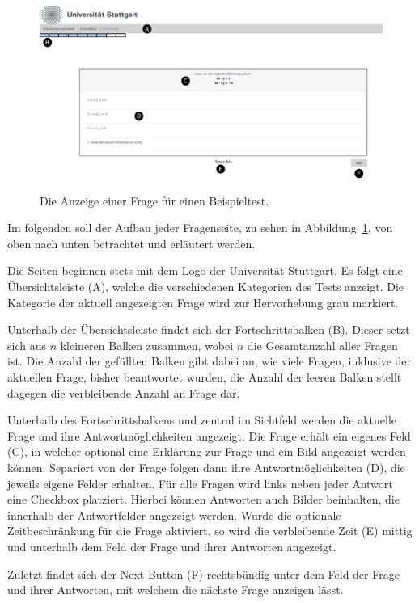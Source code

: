  \begin{figure} 
  \centering
     \includegraphics[width=\textwidth]{Jena_Images/beispielfrage.png}
  \caption{Die Anzeige einer Frage für einen Beispieltest.}
  \label{fig:beispielfrage}
\end{figure}
Im folgenden soll der Aufbau jeder Fragenseite, zu sehen in Abbildung~\ref{fig:beispielfrage}, von oben nach unten betrachtet und erläutert werden. 
  
Die Seiten beginnen stets mit dem Logo der Universität Stuttgart. 
Es folgt eine Übersichtsleiste (A), welche die verschiedenen Kategorien des Tests anzeigt. 
Die Kategorie der aktuell angezeigten Frage wird zur Hervorhebung grau markiert. 

Unterhalb der Übersichtsleiste findet sich der Fortschrittsbalken (B). 
Dieser setzt sich aus $n$ kleineren Balken zusammen, wobei $n$ die Gesamtanzahl aller Fragen ist.
Die Anzahl der gefüllten Balken gibt dabei an, wie viele Fragen, inklusive der aktuellen Frage, bisher beantwortet wurden, die Anzahl der leeren Balken stellt dagegen die verbleibende Anzahl an Frage dar. 

Unterhalb des Fortschrittsbalkens und zentral im Sichtfeld werden die aktuelle Frage und ihre Antwortmöglichkeiten angezeigt. 
Die Frage erhält ein eigenes Feld (C), in welcher optional eine Erklärung zur Frage und ein Bild angezeigt werden können.
Separiert von der Frage folgen dann ihre Antwortmöglichkeiten (D), die jeweils eigene Felder erhalten. 
Für alle Fragen wird links neben jeder Antwort eine Checkbox platziert.
Hierbei können Antworten auch Bilder beinhalten, die innerhalb der Antwortfelder angezeigt werden.
Wurde die optionale Zeitbeschränkung für die Frage aktiviert, so wird die verbleibende Zeit (E) mittig und unterhalb dem Feld der Frage und ihrer Antworten angezeigt.

Zuletzt findet sich der Next-Button (F) rechtsbündig unter dem Feld der Frage und ihrer Antworten, mit welchem die nächste Frage anzeigen lässt.

